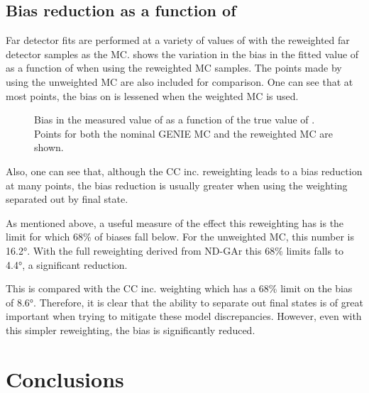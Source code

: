 \subsection{Bias reduction as a function of \dcp}
\label{sec:dune_ndrwt:rwt:biasReduction}

Far detector fits are performed at a variety of values of \dcp with the reweighted far detector samples as the MC.
 shows the variation in the bias in the fitted value of \dcp as a function of \dcpTrue when using the reweighted MC samples.
The points made by using the unweighted MC are also included for comparison.
One can see that at most points, the bias on \dcp is lessened when the weighted MC is used.

\begin{figure}[h]
	\begin{adjustbox}{max totalsize=.6\linewidth, center}
		
	\end{adjustbox}
	\caption[Bias in fit value of \dcp with ND-GAr reweighted MC]{Bias in the measured value of \dcp as a function of the true value of \dcp. Points for both the nominal GENIE MC and the reweighted MC are shown.}
	\label{fig:dcpBiasWithWgt}
\end{figure}

Also, one can see that, although the CC inc. reweighting leads to a bias reduction at many points, the bias reduction is usually greater when using the weighting separated out by final state.

As mentioned above, a useful measure of the effect this reweighting has is the limit for which 68\% of biases fall below.
For the unweighted MC, this number is \ang{16.2}. 
With the full reweighting derived from ND-GAr this 68\% limits falls to \ang{4.4}, a significant reduction.

This is compared with the CC inc. weighting which has a 68\% limit on the \dcp bias of \ang{8.6}.
Therefore, it is clear that the ability to separate out final states is of great important when trying to mitigate these model discrepancies.
However, even with this simpler reweighting, the bias is significantly reduced.

\section{Conclusions}
\label{sec:dune_ndrwt:conclusions}
